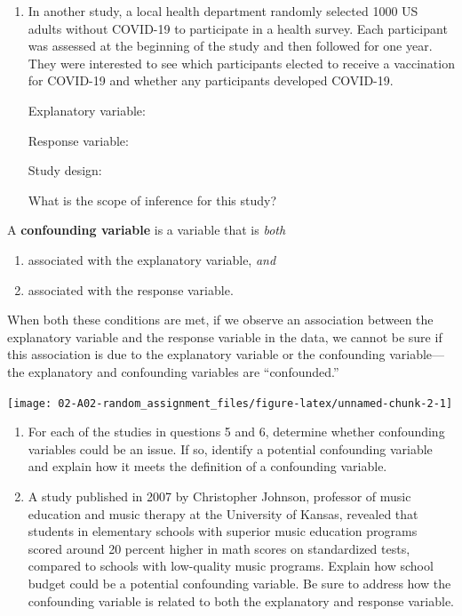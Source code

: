 \documentclass[
]{report}
\providecommand{\tightlist}{%
  \setlength{\itemsep}{0pt}\setlength{\parskip}{0pt}}
\begin{document}
\newpage

\begin{enumerate}
\def\labelenumi{\arabic{enumi}.}
\setcounter{enumi}{1}
\item
  In another study, a local health department randomly selected 1000 US adults without COVID-19 to participate in a health survey. Each participant was assessed at the beginning of the study and then followed for one year. They were interested to see which participants elected to receive a vaccination for COVID-19 and whether any participants developed COVID-19.
  \vspace{0.1in}

  Explanatory variable:
  \vspace{0.25in}

  Response variable:
  \vspace{0.25in}

  Study design:
  \vspace{0.25in}

  What is the scope of inference for this study?
  \vspace{0.5in}
\end{enumerate}

A \textbf{confounding variable} is a variable that is \emph{both}

\begin{enumerate}
\def\labelenumi{\arabic{enumi}.}
\tightlist
\item
  associated with the explanatory variable, \emph{and}
\item
  associated with the response variable.
\end{enumerate}

When both these conditions are met, if we observe an association between the explanatory variable and the response variable in the data, we cannot be sure if this association is due to the explanatory variable or the confounding variable---the explanatory and confounding variables are ``confounded.''

\begin{center}\texttt{[image: 02-A02-random\_assignment\_files/figure-latex/unnamed-chunk-2-1]} \end{center}

\begin{enumerate}
\def\labelenumi{\arabic{enumi}.}
\setcounter{enumi}{6}
\item
  For each of the studies in questions 5 and 6, determine whether confounding variables could be an issue. If so, identify a potential confounding variable and explain how it meets the definition of a confounding variable.
  \vspace{1.5in}
\item
  A study published in 2007 by Christopher Johnson, professor of music education and music therapy at the University of Kansas, revealed that students in elementary schools with superior music education programs scored around 20 percent higher in math scores on standardized tests, compared to schools with low-quality music programs. Explain how school budget could be a potential confounding variable. Be sure to address how the confounding variable is related to both the explanatory and response variable.
\end{enumerate}
\end{document}
